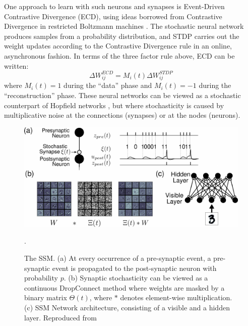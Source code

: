 \documentclass[english]{article}
\renewcommand{\cite}{\citep}
\begin{document}
One approach to learn with such neurons and synapses is Event-Driven Contrastive Divergence (ECD), using ideas borrowed from Contrastive Divergence in restricted Boltzmann machines \cite{Hinton02_traiprod}. 
The stochastic neural network produces samples from a probability distribution, and \ac{STDP} carries out the weight updates according to the Contrastive Divergence rule in an online, asynchronous fashion. 
In terms of the three factor rule above, ECD can be written:
\begin{equation}
\Delta W^{ECD}_{ij} = M_i(t) \Delta W^{STDP}_{ij}
\end{equation}
where $M_i(t) = 1$ during the ``data'' phase and $M_i(t)=-1$ during the ``reconstruction'' phase.
These neural networks can be viewed as a stochastic counterpart of Hopfield networks \cite{Hopfield82_neurnetw}, but where stochasticity is caused by multiplicative noise at the connections (synapses) or at the nodes (neurons).
%
\begin{figure}
    \centering
    \includegraphics[width=.9\textwidth]{img/fig_srbm.pdf}
    \caption{\label{fig:srbm} The \acf{SSM}. (a) At every occurrence of a pre-synaptic event, a pre-synaptic event is propagated to the post-synaptic neuron with probability $p$. (b) Synaptic stochasticity can be viewed as a continuous DropConnect method \cite{Wan_etal13_reguneur} where weights are masked by a binary matrix $\Theta(t)$, where $\ast$ denotes element-wise multiplication. (c) \ac{SSM} Network architecture, consisting of a visible and a hidden layer. Reproduced from \cite{Neftci_etal16_stocsyna}}.
\end{figure}
%
\end{document}
